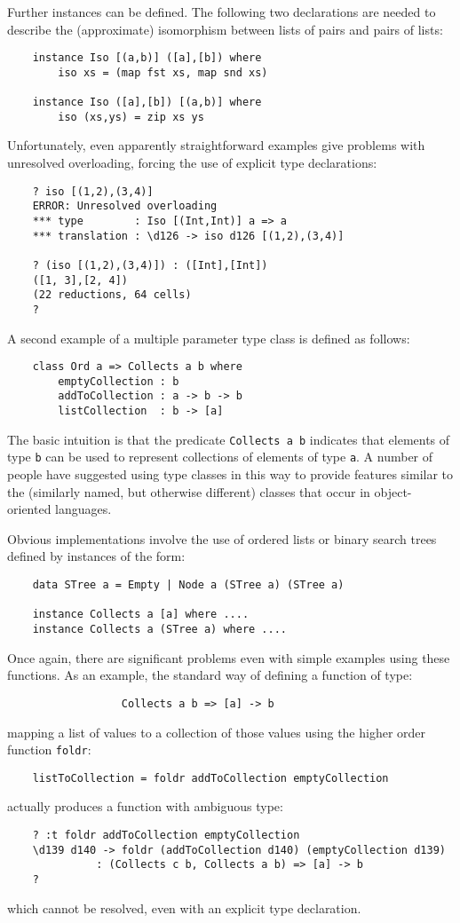 Further instances can be defined.  The following two  declarations  are
needed to describe the (approximate) isomorphism between lists of pairs
and pairs of lists:
\begin{verbatim}
    instance Iso [(a,b)] ([a],[b]) where  
        iso xs = (map fst xs, map snd xs)
 
    instance Iso ([a],[b]) [(a,b)] where
        iso (xs,ys) = zip xs ys
\end{verbatim}
Unfortunately, even apparently straightforward examples  give  problems
with  unresolved  overloading,  forcing  the  use  of   explicit   type
declarations:
\begin{verbatim}
    ? iso [(1,2),(3,4)]
    ERROR: Unresolved overloading
    *** type        : Iso [(Int,Int)] a => a
    *** translation : \d126 -> iso d126 [(1,2),(3,4)]

    ? (iso [(1,2),(3,4)]) : ([Int],[Int])
    ([1, 3],[2, 4])
    (22 reductions, 64 cells)
    ?
\end{verbatim}
A second example of a multiple  parameter  type  class  is  defined  as
follows:
\begin{verbatim}
    class Ord a => Collects a b where
        emptyCollection : b
        addToCollection : a -> b -> b
        listCollection  : b -> [a]
\end{verbatim}
The basic intuition is that the predicate \verb"Collects a b"  indicates  that
elements of type \verb"b" can be used to represent collections of elements  of
type \verb"a".  A number of people have suggested using type classes  in  this
way to provide features similar to the (similarly named, but  otherwise
different) classes that occur in object-oriented languages.

Obvious implementations involve the use  of  ordered  lists  or  binary
search trees defined by instances of the form:
\begin{verbatim}
    data STree a = Empty | Node a (STree a) (STree a)
 
    instance Collects a [a] where ....
    instance Collects a (STree a) where ....
\end{verbatim}
Once again, there are significant problems even  with  simple  examples
using these functions.  As an example, the standard way of  defining  a
function of type:
\begin{verbatim}
                  Collects a b => [a] -> b
\end{verbatim}
mapping a list of values to a collection  of  those  values  using  the
higher order function \verb"foldr":
\begin{verbatim}
    listToCollection = foldr addToCollection emptyCollection
\end{verbatim}
actually produces a function with ambiguous type:
\begin{verbatim}
    ? :t foldr addToCollection emptyCollection
    \d139 d140 -> foldr (addToCollection d140) (emptyCollection d139)
              : (Collects c b, Collects a b) => [a] -> b
    ?
\end{verbatim}
which cannot be resolved, even with an explicit type declaration.

